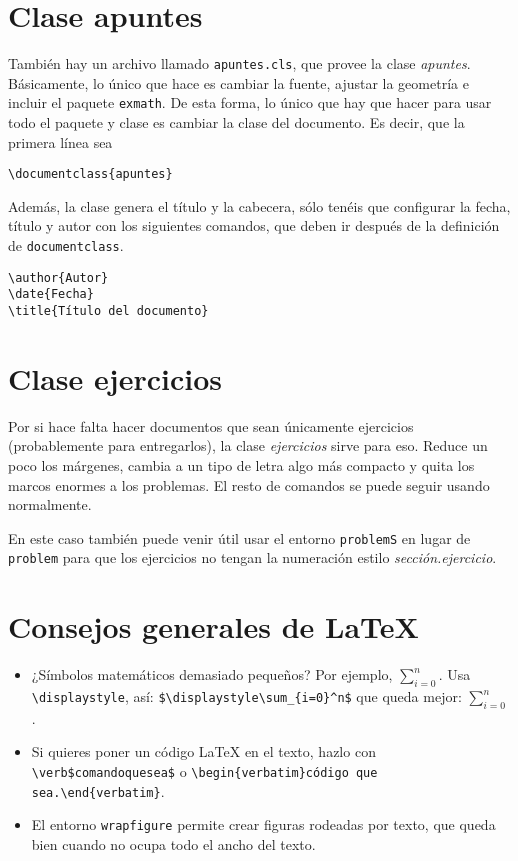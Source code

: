 \documentclass[nochap]{apuntes}
\begin{document}
 \section{Clase apuntes}

 También hay un archivo llamado \texttt{apuntes.cls}, que provee la clase \textit{apuntes}. Básicamente, lo único que hace es cambiar la fuente, ajustar la geometría e incluir el paquete \texttt{exmath}. De esta forma, lo único que hay que hacer para usar todo el paquete y clase es cambiar la clase del documento. Es decir, que la primera línea sea

\begin{verbatim}
\documentclass{apuntes}
\end{verbatim}

 Además, la clase genera el título y la cabecera, sólo tenéis que configurar la fecha, título y autor con los siguientes comandos, que deben ir después de la definición de \texttt{documentclass}.

\begin{verbatim}
\author{Autor}
\date{Fecha}
\title{Título del documento}
\end{verbatim}

\section{Clase ejercicios}

Por si hace falta hacer documentos que sean únicamente ejercicios (probablemente para entregarlos), la clase \textit{ejercicios} sirve para eso. Reduce un poco los márgenes, cambia a un tipo de letra algo más compacto y quita los marcos enormes a los problemas. El resto de comandos se puede seguir usando normalmente.

En este caso también puede venir útil usar el entorno \texttt{problemS} en lugar de \texttt{problem} para que los ejercicios no tengan la numeración estilo \textit{sección.ejercicio}.

\section{Consejos generales de \LaTeX}

\begin{itemize}
\item ¿Símbolos matemáticos demasiado pequeños? Por ejemplo, $\sum_{i=0}^n$. Usa \verb|\displaystyle|, así: \verb|$\displaystyle\sum_{i=0}^n$| que queda mejor: $\displaystyle\sum_{i=0}^n$.
\item Si quieres poner un código LaTeX en el texto, hazlo con \verb|\verb$comandoquesea$| o \verb|\begin{verbatim}código que sea.\end{verbatim}|.
\item El entorno \texttt{wrapfigure} permite crear figuras rodeadas por texto, que queda bien cuando no ocupa  todo el ancho del texto.
\end{itemize}
\end{document}

